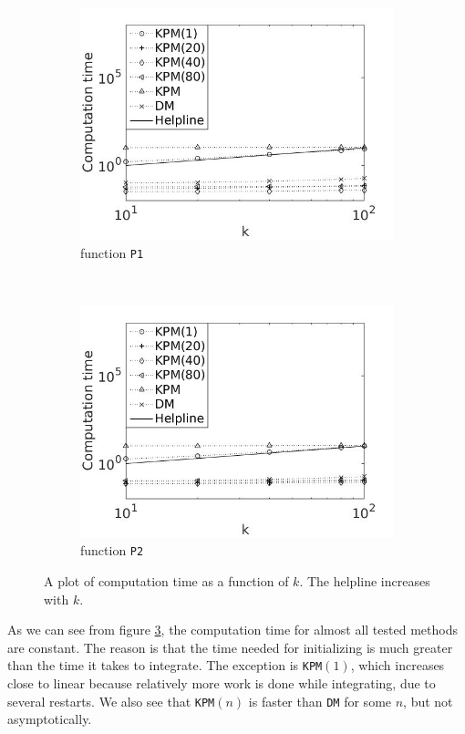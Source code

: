 \begin{figure}[H]
        \centering
        \begin{subfigure}[b]{0.45\textwidth}
                \includegraphics[width=\textwidth]{fig/n7timevsk1}
                \caption{function \texttt{P1}}
                \label{fig:timek1}
        \end{subfigure}%
~
        \begin{subfigure}[b]{0.45\textwidth}
                \includegraphics[width=\textwidth]{fig/n8timevsk2}
                \caption{function \texttt{P2}}
                \label{fig:timek2}
        \end{subfigure}
        \caption{A plot of computation time as a function of $k$. The helpline increases with $k$.}\label{fig:timek}
\end{figure}
As we can see from figure \ref{fig:timek}, the computation time for almost all tested methods are constant. The reason is that the time needed for initializing is much greater than the time it takes to integrate. 
The exception is \texttt{KPM}$(1)$, which increases close to linear because relatively more work is done while integrating, due to several restarts. 
We also see that \texttt{KPM}$(n)$ is faster than \texttt{DM} for some $n$, but not asymptotically.


